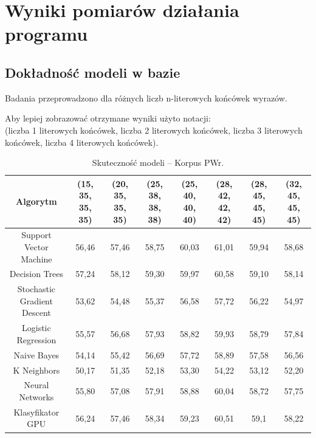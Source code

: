 \section{Wyniki pomiarów działania programu}
\subsection{Dokładność modeli w bazie}
Badania przeprowadzono dla różnych liczb n-literowych końcówek wyrazów. 
\begin{landscape}
	\noindent Aby lepiej zobrazować otrzymane wyniki użyto notacji:\\ (liczba 1 literowych końcówek, liczba 2 literowych końcówek, liczba 3 literowych końcówek, liczba 4 literowych końcówek).
	\begin{table}[!htbp]
		\centering
		\caption{Skuteczność modeli -- Korpus PWr.}
		\begin{tabular}{cccccccc}
			\toprule
			\textbf{Algorytm} & \textbf{(15, 35, 35, 35)} & \textbf{(20, 35, 35, 35)} & \textbf{(25, 38, 38, 38)} & \textbf{(25, 40, 40, 40)} & \textbf{(28, 42, 42, 42)} & \textbf{(28, 45, 45, 45)} & \textbf{(32, 45, 45, 45)} \\
			\midrule
			Support Vector Machine & 56,46 & 57,46 & 58,75 & 60,03 & 61,01 & 59,94 & 58,68 \\
			Decision Trees & 57,24 & 58,12 & 59,30 & 59,97 & 60,58 & 59,10 & 58,14 \\
			Stochastic Gradient Descent & 53,62 & 54,48 & 55,37 & 56,58 & 57,72 & 56,22 & 54,97 \\
			Logistic Regression & 55,57 & 56,68 & 57,93 & 58,82 & 59,93 & 58,79 & 57,84 \\
			Naive Bayes & 54,14 & 55,42 & 56,69 & 57,72 & 58,89 & 57,58 & 56,56 \\
			K Neighbors & 50,17 & 51,35 & 52,18 & 53,30 & 54,22 & 53,12 & 52,20 \\
			Neural Networks & 55,80 & 57,08 & 57,91 & 58,88 & 60,04 & 58,72 & 57,75 \\ 
			Klasyfikator GPU & 56,24 & 57,46 & 58,34 & 59,23 & 60,51 & 59,1 & 58,22 \\
			\bottomrule
		\end{tabular}
	\end{table}
	

\end{landscape}
